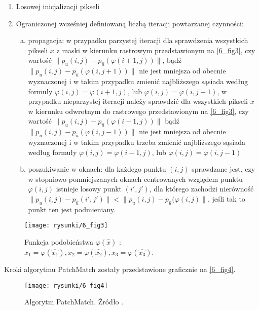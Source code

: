 \documentclass[12pt, twoside, openany]{report}
\theoremstyle{definition}
\begin{document}
\begin{enumerate}
\item
Losowej inicjalizacji pikseli
\item
Ograniczonej wcześniej definiowaną liczbą iteracji powtarzanej czynności:
\begin{enumerate}[a)]
\item
propagacja: w przypadku parzystej iteracji dla sprawdzenia wszystkich pikseli $x$ z maski w kierunku rastrowym przedstawionym na \autoref{6_fig3}, czy 
wartość $\big\| p_u(i,j) - p_{\hat{u}}(\varphi(i+1,j)) \big\|$, bądź $\big\| p_{u}(i,j) - p_{\hat{u}}(\varphi(i,j+1)) \big\|$ nie jest mniejsza od obecnie wyznaczonej i w takim przypadku zmienić najbliższego sąsiada według formuły $\varphi(i,j) = \varphi(i+1,j)$, lub $\varphi(i,j) = \varphi(i,j+1)$, 
w przypadku nieparzystej iteracji należy sprawdzić dla wszystkich pikseli $x$ w kierunku odwrotnym do rastrowego przedstawionym na \autoref{6_fig3}, czy 
wartość $\big\| p_{u}(i,j) - p_{\hat{u}}(\varphi(i-1,j)) \big\|$ bądź $\big\| p_{u}(i,j) - p_{\hat{u}}(\varphi(i,j-1)) \big\|$ nie jest mniejsza od obecnie wyznaczonej i w takim przypadku trzeba zmienić najbliższego sąsiada według formuły $\varphi(i,j) = \varphi(i-1,j)$, lub $\varphi(i,j) = \varphi(i,j-1)$
\item
poszukiwanie w oknach: dla każdego punktu $(i,j)$ sprawdzane jest, czy w stopniowo pomniejszanych oknach centrowanych względem punktu $\varphi(i,j)$ istnieje losowy punkt $(i', j')$, dla którego zachodzi nierówność $\big\| p_{u}(i,j) - p_{\hat{u}}(i',j') \big\| < \big\| p_{u}(i,j) - p_{\hat{u}}(\varphi(i,j) \big\|$, jeśli tak to punkt ten jest podmieniany.
\end{enumerate}
\end{enumerate}
\begin{figure}[!h]
	\centering
	\texttt{[image: rysunki/6\_fig3]}
	\caption{Funkcja podobieństwa $\varphi(\hat{x})$ : $x_1 = \varphi(\hat{x_1}), x_2 = \varphi(\hat{x_2}), x_3 = \varphi(\hat{x_3})$.}
	\label{6_fig3}
\end{figure}
Kroki algorytmu PatchMatch zostały przedstawione graficznie na \autoref{6_fig4}.
\begin{figure}[!h]
	\centering
	\texttt{[image: rysunki/6\_fig4]}
	\caption{Algorytm PatchMatch. Źródło \cite{arias2011variational}.}
	\label{6_fig4}
\end{figure}
\end{document}
